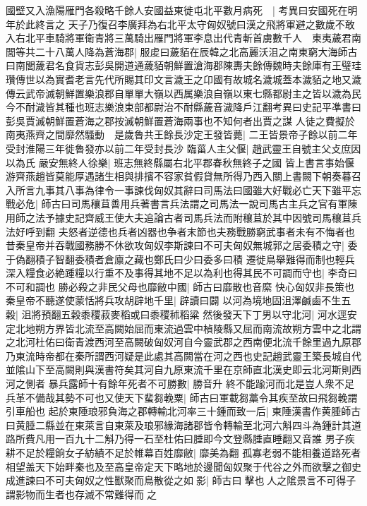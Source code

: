 國壁又入漁陽雁門各殺略千餘人安國益東徙屯北平數月病死　|{
	考異曰安國死在明年於此終言之}
天子乃復召李廣拜為右北平太守匈奴號曰漢之飛將軍避之數歲不敢入右北平車騎將軍衛青將三萬騎出雁門將軍李息出代青斬首虜數千人　東夷薉君南閭等共二十八萬人降為蒼海郡|{
	服䖍曰薉貊在辰韓之北高麗沃沮之南東窮大海師古曰南閭薉君名食貨志彭吳開道通薉貊朝鮮置滄海郡陳夀夫餘傳魏時夫餘庫有王璧珪瓚傳世以為實耆老言先代所賜其印文言濊王之卬國有故城名濊城蓋本濊貊之地又濊傳云武帝滅朝鮮置樂浪郡自單單大嶺以西属樂浪自嶺以東七縣都尉主之皆以濊為民今不耐濊皆其種也班志樂浪束部都尉治不耐縣薉音濊降戶江翻考異曰史記平凖書曰彭吳賈滅朝鮮置蒼海之郡按滅朝鮮置蒼海兩事也不知何者出賈之謀}
人徒之費擬於南夷燕齊之間靡然騷動　是歲魯共王餘長沙定王發皆薨|{
	二王皆景帝子餘以前二年受封淮陽三年徙魯發亦以前二年受封長沙}
臨菑人主父偃|{
	趙武靈王自號主父攴庶因以為氏}
嚴安無終人徐樂|{
	班志無終縣屬右北平郡春秋無終子之國}
皆上書言事始偃游齊燕趙皆莫能厚遇諸生相與排擯不容家貧假貸無所得乃西入關上書闕下朝奏暮召入所言九事其八事為律令一事諫伐匈奴其辭曰司馬法曰國雖大好戰必亡天下雖平忘戰必危|{
	師古曰司馬穰苴善用兵著書言兵法謂之司馬法一說司馬古主兵之官有軍陳用師之法予據史記齊威王使大夫追論古者司馬兵法而附穰苴於其中因號司馬穰苴兵法好呼到翻}
夫怒者逆德也兵者凶器也争者末節也夫務戰勝窮武事者未有不悔者也昔秦皇帝并吞戰國務勝不休欲攻匈奴李斯諫曰不可夫匈奴無城郭之居委積之守|{
	委于偽翻積子智翻委積者倉廪之藏也鄭氏曰少曰委多曰積}
遷徙鳥舉難得而制也輕兵深入糧食必絶踵糧以行重不及事得其地不足以為利也得其民不可調而守也|{
	李奇曰不可和調也}
勝必殺之非民父母也靡敝中國|{
	師古曰靡散也音縻}
快心匈奴非長策也秦皇帝不聽遂使蒙恬將兵攻胡辟地千里|{
	辟讀曰闢}
以河為境地固沮澤鹹鹵不生五穀|{
	沮將預翻五穀黍稷菽麥稻或曰黍稷秫稻粱}
然後發天下丁男以守北河|{
	河水逕安定北地朔方界皆北流至高闕始屈而東流過雲中楨陵縣又屈而南流故朔方雲中之北謂之北河杜佑曰衛青渡西河至高闕破匈奴河自今靈武郡之西南便北流千餘里過九原郡乃東流時帝都在秦所謂西河疑是此處其高闕當在河之西也史記趙武靈王築長城自代並隂山下至高闕則與漢書符矣其河自九原東流千里在京師直北漢史即云北河斯則西河之側者}
暴兵露師十有餘年死者不可勝數|{
	勝音升}
終不能踰河而北是豈人衆不足兵革不備哉其勢不可也又使天下蜚芻輓粟|{
	師古曰軍載芻藁令其疾至故曰飛芻輓謂引車船也}
起於東陲琅邪負海之郡轉輸北河率三十鍾而致一后|{
	東陲漢書作黄腄師古曰黄腄二縣並在東萊言自東萊及琅邪緣海諸郡皆令轉輸至北河六斛四斗為鍾計其道路所費凡用一百九十二斛乃得一石至杜佑曰腄即今文登縣腄直睡翻又音誰}
男子疾耕不足於糧餉女子紡績不足於帷幕百姓靡敝|{
	靡美為翻}
孤寡老弱不能相養道路死者相望盖天下始畔秦也及至高皇帝定天下略地於邊聞匈奴聚于代谷之外而欲擊之御史成進諫曰不可夫匈奴之性獸聚而鳥散從之如影|{
	師古曰擊也人之隂景言不可得子謂影物而生者也存滅不常難得而之}
